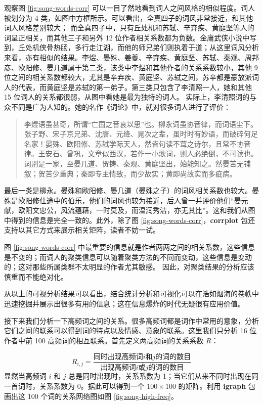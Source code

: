 \documentclass[
  b5paper,
  UTF8,twoside]{book}
\begin{document}
观察图 \ref{fig:song-words-corr} 可以一目了然地看到词人之间风格的相似程度。词人被划分为 4 类，如图中方框所示。可以看出，全真四子的词风非常接近，和其他词人风格差别较大； 而全真四子中，只有丘处机和苏轼、辛弃疾、黄庭坚等人的词呈正相关，而其他三子和另外 12 位作者相关系数都为负数。金庸武侠小说中写到，丘处机侠骨热肠，多行走江湖，而他的师兄弟们则执着于道；从这里词风分析来看，亦有相似的结果。李煜、晏殊、姜夔、辛弃疾、黄庭坚、苏轼、秦观、周邦彦、欧阳修、晏几道属于第二类，该类中李煜和其他作者的关系系数较小，其他 9 位之间的相关系数都较大，尤其是辛弃疾、黄庭坚、苏轼之间，苏辛都是豪放派词人的代表，而黄庭坚是苏轼的第一弟子。第三类只包含了李清照一人，她和其他 15 位词人的关系都很弱，从图中看她是最为独特的词人。 实际上，李清照词的与众不同是广为人知的。她的名作《词论》中，就对很多词人进行了评价：

\begin{quote}
李煜语虽甚奇，所谓``亡国之音哀以思''也。柳永词虽协音律，而词语尘下。张子野、宋子京兄弟、沈唐、元绛、晁次之辈，虽时时有妙语，而破碎何足名家！晏殊、欧阳修、苏轼学际天人，然皆句读不茸之诗尔，且常不协音律。王安石、曾巩，文章似西汉，若作一小歌词，则人必绝倒，不可读也。词别是一家，至晏几道、贺铸、秦观、黄庭坚出，始能知之。然晏苦无铺叙；贺苦少重典；秦即专主情致，而少故实；黄即尚故实而多疵病。
\end{quote}

最后一类是柳永。晏殊和欧阳修、晏几道（晏殊之子）的词风相关系数也较大。晏殊是欧阳修仕途中的伯乐，他们的词风也较为接近，后人曾一并评价他们``晏元献，欧阳文忠公，风流蕴藉，一时莫及，而温润秀洁，亦无其比''。这和我们从图中得到的信息是完全一致的。此外，除了图 \ref{fig:song-words-corr}，\textbf{corrplot} 包还支持以其它方式来展示相关矩阵，读者不妨一试。

图 \ref{fig:song-words-corr} 中最重要的信息就是作者两两之间的相关系数，这些信息是不变的；而词人的聚类信息可以随着聚类方法的不同而变动，这些信息是变动的；这对那些所属类群不太明显的作者尤其敏感。 因此，对聚类结果的分析应该慎重而不能绝对化。

从以上的可视分析结果可以看出，结合统计分析和可视化可以在浩如烟海的卷帙中迅速挖掘并展示出很多有用的信息；这在信息爆炸的时代无疑很有应用价值。

接下来我们分析一下高频词之间的关系。很多高频词都是词作中常用的意象，分析它们之间的联系可以得到词的特点以及情感、意象的联系。这里我们只分析 16 位作者中前 100 高频词的相互联系。首先定义两高频词的关系系数 \(R\)：

\[R_{i,j}=\frac{\mbox{同时出现高频词}i\mbox{和}{j}\mbox{的词的数目}}{\mbox{出现高频词}i\mbox{或}j\mbox{的词的数目}}\]
显然当高频词 \(i\) 和 \(j\) 总是同时出现时，关系系数为 1；当它们从来不同时出现在同一首词时，关系系数为 0。据此可以得到一个 \(100\times100\) 的矩阵。利用 \textbf{igraph} 包 \citep{igraph} 画出这 100 个词的关系网络图如图 \ref{fig:song-high-freq}。
\end{document}
